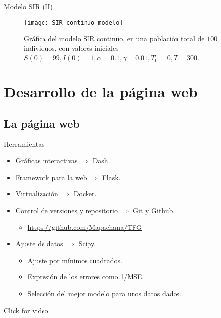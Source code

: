 \begin{frame}{Modelo SIR (II)}
    \begin{figure}
        \begin{center}
        \caption{Gráfica del modelo SIR continuo, en una población total de $100$ individuos, con valores iniciales $S(0)=99, I(0) = 1, \alpha = 0.1, \gamma = 0.01, T_0 = 0, T = 300$.}
        \label{fig: SIR_continuo}
        \texttt{[image: SIR\_continuo\_modelo]}
        \end{center}
        \end{figure}
\end{frame}





\section{Desarrollo de la página web}


\subsection{La página web}


\begin{frame}{Herramientas}

    \begin{itemize}
        \item Gráficas interactivas $\Rightarrow$ Dash.
        \pause
        \item Framework para la web $\Rightarrow$ Flask.
        \pause
        \item Virtualización $\Rightarrow$ Docker.
        \pause
        \item Control de versiones y repositorio $\Rightarrow$ Git y Github.
        \begin{itemize}
            \item \href{https://github.com/Mapachana/TFG}{https://github.com/Mapachana/TFG}
        \end{itemize}
        \pause
        \item Ajuste de datos $\Rightarrow$ Scipy.
        \begin{itemize}
            \item Ajuste por mínimos cuadrados.
            \item Expresión de los errores como 1/MSE.
            \item Selección del mejor modelo para unos datos dados.
        \end{itemize}
    \end{itemize}

    \pause

    \href{run:/home/mapachana/2022-06-23 19-38-25.mkv}{Click for video}

\end{frame}


